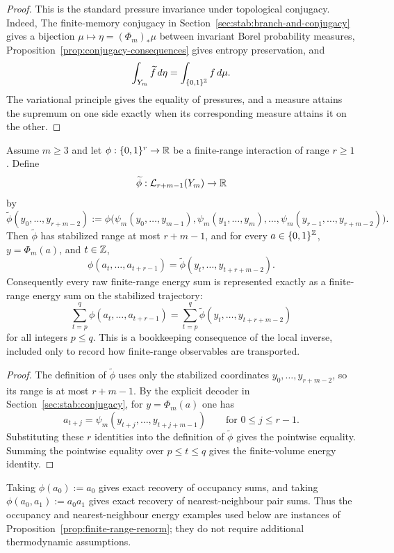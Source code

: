 \begin{proof}
This is the standard pressure invariance under topological conjugacy. Indeed,
The finite-memory conjugacy in Section~\ref{sec:stab:branch-and-conjugacy} gives a bijection
$\mu\mapsto\eta=(\Phi_m)_*\mu$ between invariant Borel probability measures,
Proposition~\ref{prop:conjugacy-consequences} gives entropy preservation, and
\[
\int_{Y_m}\widetilde f\,d\eta
=
\int_{\{0,1\}^{\mathbb{Z}}} f\,d\mu .
\]
The variational principle \cite{Walters1982} gives the equality of pressures,
and a measure attains the supremum on one side exactly when its corresponding
measure attains it on the other.
\end{proof}

\begin{proposition}\label{prop:finite-range-renorm}
Assume $m\ge3$ and let $\phi:\{0,1\}^r\to\mathbb{R}$ be a finite-range interaction
of range $r\ge1$.  Define
\[
\widetilde\phi:\mathcal L_{r+m-1}(Y_m)\to\mathbb{R}
\]
by
\[
\widetilde\phi(y_0,\ldots,y_{r+m-2})
:=
\phi\bigl(
\psi_m(y_0,\ldots,y_{m-1}),
\psi_m(y_1,\ldots,y_m),
\ldots,
\psi_m(y_{r-1},\ldots,y_{r+m-2})
\bigr).
\]
Then $\widetilde\phi$ has stabilized range at most $r+m-1$, and for every
$a\in\{0,1\}^{\mathbb{Z}}$, $y=\Phi_m(a)$, and $t\in\mathbb{Z}$,
\[
\phi(a_t,\ldots,a_{t+r-1})
=
\widetilde\phi(y_t,\ldots,y_{t+r+m-2}).
\]
Consequently every raw finite-range energy sum is represented exactly as a
finite-range energy sum on the stabilized trajectory:
\[
\sum_{t=p}^{q}\phi(a_t,\ldots,a_{t+r-1})
=
\sum_{t=p}^{q}\widetilde\phi(y_t,\ldots,y_{t+r+m-2})
\]
for all integers $p\le q$.
This is a bookkeeping consequence of the local inverse, included only to
record how finite-range observables are transported.
\end{proposition}

\begin{proof}
The definition of $\widetilde\phi$ uses only the stabilized coordinates
$y_0,\ldots,y_{r+m-2}$, so its range is at most $r+m-1$.  By
the explicit decoder in Section~\ref{sec:stab:conjugacy}, for $y=\Phi_m(a)$ one has
\[
a_{t+j}=\psi_m(y_{t+j},\ldots,y_{t+j+m-1})
\qquad\text{for }0\le j\le r-1.
\]
Substituting these $r$ identities into the definition of $\widetilde\phi$
gives the pointwise equality.  Summing the pointwise equality over
$p\le t\le q$ gives the finite-volume energy identity.
\end{proof}

\begin{remark}
Taking $\phi(a_0):=a_0$ gives exact recovery of occupancy sums, and taking
$\phi(a_0,a_1):=a_0a_1$ gives exact recovery of nearest-neighbour pair sums.
Thus the occupancy and nearest-neighbour energy examples used below are
instances of Proposition~\ref{prop:finite-range-renorm}; they do not require
additional thermodynamic assumptions.
\end{remark}
